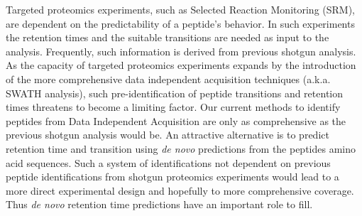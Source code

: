 \documentclass[a4paper]{article}
\begin{document}
Targeted proteomics experiments, such as Selected Reaction Monitoring
(SRM), are dependent on the predictability of a peptide's behavior. In
such experiments the retention times and the suitable transitions are
needed as input to the analysis. Frequently, such information is
derived from previous shotgun analysis. As the capacity of targeted
proteomics experiments expands by the introduction of the more
comprehensive data independent acquisition techniques
\cite{Venable2004} (a.k.a. SWATH analysis), such pre-identification of
peptide transitions and retention times threatens to become a limiting
factor. Our current methods to identify peptides from Data Independent
Acquisition are only as comprehensive as the previous shotgun analysis
would be. An attractive alternative is to predict retention time and
transition using {\em de novo} predictions from the peptides amino
acid sequences.  Such a system of identifications not dependent on
previous peptide identifications from shotgun proteomics experiments
would lead to a more direct experimental design and hopefully to more
comprehensive coverage. Thus {\em de novo} retention time predictions
have an important role to fill.




\end{document}
